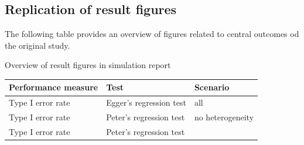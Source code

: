 \documentclass[
  english,
  doc,floatsintext,draftall]{apa6}
\begin{document}
\hypertarget{replication-of-result-figures}{%
\subsection{Replication of result figures}\label{replication-of-result-figures}}

The following table provides an overview of figures related to central outcomes od the original study.

Overview of result figures in simulation report

\begin{longtable}[]{@{}lll@{}}
\toprule
\begin{minipage}[b]{0.30\columnwidth}\raggedright
Performance measure\strut
\end{minipage} & \begin{minipage}[b]{0.30\columnwidth}\raggedright
Test\strut
\end{minipage} & \begin{minipage}[b]{0.30\columnwidth}\raggedright
Scenario\strut
\end{minipage}\tabularnewline
\midrule
\endhead
\begin{minipage}[t]{0.30\columnwidth}\raggedright
Type I error rate\strut
\end{minipage} & \begin{minipage}[t]{0.30\columnwidth}\raggedright
Egger's regression test\strut
\end{minipage} & \begin{minipage}[t]{0.30\columnwidth}\raggedright
all\strut
\end{minipage}\tabularnewline
\begin{minipage}[t]{0.30\columnwidth}\raggedright
Type I error rate\strut
\end{minipage} & \begin{minipage}[t]{0.30\columnwidth}\raggedright
Peter's regression test\strut
\end{minipage} & \begin{minipage}[t]{0.30\columnwidth}\raggedright
no heterogeneity\strut
\end{minipage}\tabularnewline
\begin{minipage}[t]{0.30\columnwidth}\raggedright
Type I error rate\strut
\end{minipage} & \begin{minipage}[t]{0.30\columnwidth}\raggedright
Peter's regression test\strut
\end{minipage} & \begin{minipage}[t]{0.30\columnwidth}\raggedright

\end{minipage}
\end{longtable}
\end{document}
